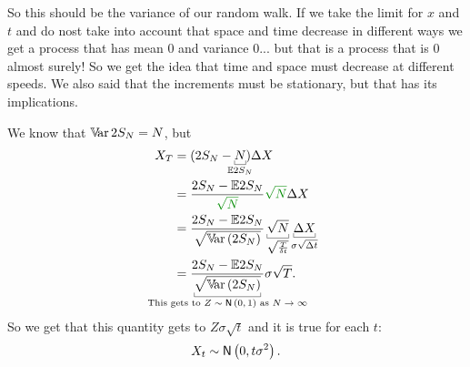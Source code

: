 \documentclass[12pt]{report}
\begin{document}
So this should be the variance of our random walk. If we take the limit for $x$ and $t$ and do nost take into account that space and time decrease in different ways we get a process that has mean 0 and variance 0... but that is a process that is 0 almost surely! So we get the idea that time and space must decrease at different speeds. We also said that the increments must be stationary, but that has its implications.
\begin{remark}
	We know that $\mathbb{V}\!\mathrm{ar}\, 2S_{N}=N$, but
	\begin{align*}
		X_{T}&=(2S_{N}-\ubracketthin{N}_{\mathclap{\evs 2 S_{N}}})\Delta X\\
		&=\frac{2 S_{N}-\evs 2 S_{N}}{\mathcolor{Green4}{\sqrt{N}}}\mathcolor{Green4}{\sqrt{N}}\Delta X\\
		&=\frac{2S_{N}-\evs 2 S_{N}}{\sqrt{\var(2S_{N})}}\ubracketthin{\sqrt{N}}_{\sqrt{\frac{T}{\delta t}}}\ubracketthin{\Delta X}_{{\sigma\sqrt{\Delta t}}}\\
		&=\frac{2S_{N}-\evs 2 S_{N}}{\ubracketthin{\sqrt{\var(2S_{N})}}_{\claptext{This gets to $Z\distnorm{0,1}$ as $N\to\infty$}}}\sigma\sqrt{T}.
	\end{align*}
	So we get that this quantity gets to $Z\sigma\sqrt{t}$ and it is true for each $t$:
	\begin{equation*}
		X_{t}\sim\mathsf{N}\left(0,t\sigma^{2}\right).
	\end{equation*}
\end{remark}
\end{document}
